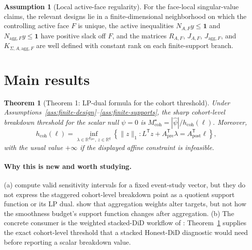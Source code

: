 \documentclass[11pt]{article}
\newcommand{\one}{\mathbf{1}}
\newcommand{\transpose}{\mathsf{T}}
\newcommand{\R}{\mathbb{R}}
\theoremstyle{definition}
\newtheorem{assumption}{Assumption}
\theoremstyle{plain}
\newtheorem{theorem}{Theorem}
\theoremstyle{remark}
\begin{document}
\begin{assumption}[Local active-face regularity]\label{ass:active-face-regularity}
For the face-local singular-value claims, the relevant designs lie in a finite-dimensional neighborhood on which the controlling active face \(F\) is unique, the active inequalities \(N_{A,F}y\le\one\) and \(N_{\mathrm{agg},F}y\le\one\) have positive slack off \(F\), and the matrices \(R_{A,F}\), \(J_{A,F}\), \(J_{\mathrm{agg},F}\), and \(K_{\Sigma,A,\mathrm{agg},F}\) are well defined with constant rank on each finite-support branch.
\end{assumption}

\section{Main results}
\begin{theorem}[Theorem 1: LP-dual formula for the cohort threshold]\label{thm:lp-dual}
Under Assumptions~\ref{ass:finite-design}--\ref{ass:finite-supports}, the sharp cohort-level breakdown threshold for the scalar null \(\psi=0\) is \(M_{\mathrm{coh}}^\star=|\hat\psi|/h_{\mathrm{coh}}(\ell)\).
Moreover,
\[
h_{\mathrm{coh}}(\ell)
=
\inf_{\lambda\in\R^{E_{\mathrm{pre}}},\,z\in\R^q}
\left\{\|z\|_1:
L^\transpose z + A_{\mathrm{pre}}^\transpose\lambda
=
A_{\mathrm{post}}^\transpose\ell
\right\},
\]
with the usual value \(+\infty\) if the displayed affine constraint is infeasible.
\end{theorem}

\paragraph{Why this is new and worth studying.}
(a) \citet{rambachan2023parallel} compute valid sensitivity intervals for a fixed event-study vector, but they do not express the staggered cohort-level breakdown point as a quotient support function or its LP dual.
\citet{wing2024stacked} show that aggregation weights alter targets, but not how the smoothness budget's support function changes after aggregation.
(b) The concrete consumer is the weighted stacked-DiD workflow of \citet{wing2024stacked}: Theorem~\ref{thm:lp-dual} supplies the exact cohort-level threshold that a stacked Honest-DiD diagnostic would need before reporting a scalar breakdown value.
\end{document}
